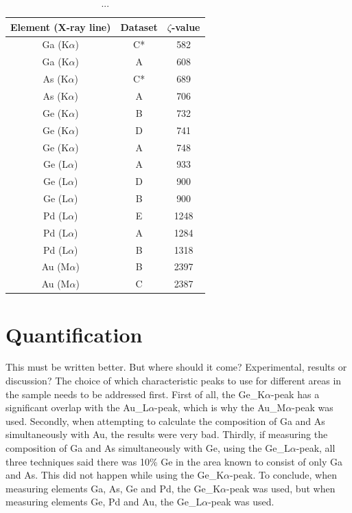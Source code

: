\begin{table}
	\caption{...}
	\begin{center}
	\begin{tabular}{ccc}

	Element (X-ray line) & Dataset & $\zeta$-value \\ 
	\midrule
	\hline
	Ga (K$\alpha$)  & C* & 582\\
	Ga (K$\alpha$)  & A  & 608\\
	As (K$\alpha$)  & C* & 689\\
	As (K$\alpha$)  & A  & 706\\
	Ge (K$\alpha$)  & B  & 732\\
	Ge (K$\alpha$)  & D  & 741\\
	Ge (K$\alpha$)  & A  & 748\\
	Ge (L$\alpha$)  & A  & 933\\
	Ge (L$\alpha$)  & D  & 900\\
	Ge (L$\alpha$)  & B  & 900\\
	Pd (L$\alpha$)  & E  & 1248\\
	Pd (L$\alpha$)  & A  & 1284\\
	Pd (L$\alpha$)  & B  & 1318\\
	Au (M$\alpha$) & B & 2397\\
	Au (M$\alpha$) & C & 2387\\
	\hline
	\end{tabular}
	\end{center}
	\label{tab:non-heated zeta-values}
\end{table}

\section{Quantification}

This must be written better. But where should it come? Experimental, results or discussion?
The choice of which characteristic peaks to use for different areas in the sample needs to be addressed first. First of all, the Ge\_{K$\alpha$}-peak has a significant overlap with the Au\_{L$\alpha$}-peak, which is why the Au\_{M$\alpha$}-peak was used. Secondly, when attempting to calculate the composition of Ga and As simultaneously with Au, the results were very bad. Thirdly, if measuring the composition of Ga and As simultaneously with Ge, using the Ge\_{L$\alpha$}-peak, all three techniques said there was 10\% Ge in the area known to consist of only Ga and As. This did not happen while using the Ge\_{K$\alpha$}-peak. To conclude, when measuring elements Ga, As, Ge and Pd, the Ge\_{K$\alpha$}-peak was used, but when measuring elements Ge, Pd and Au, the Ge\_{L$\alpha$}-peak was used.


